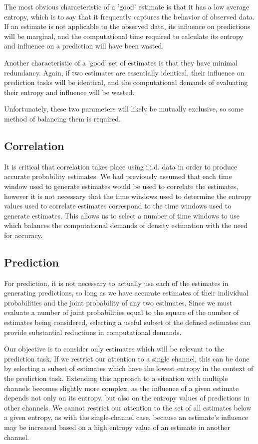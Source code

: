 \documentclass[10pt]{article}
\begin{document}
The most obvious characteristic of a 'good' estimate is that it has a low average entropy, which is to say that it frequently captures the behavior of observed data.  If an estimate is not applicable to the observed data, its influence on predictions will be marginal, and the computational time required to calculate its entropy and influence on a prediction will have been wasted.  

Another characteristic of a 'good' set of estimates is that they have minimal redundancy.  Again, if two estimates are essentially identical, their influence on prediction tasks will be identical, and the computational demands of evaluating their entropy and influence will be wasted. 

Unfortunately, these two parameters will likely be mutually exclusive, so some method of balancing them is required.

\subsection{Correlation}
It is critical that correlation takes place using i.i.d. data in order to produce accurate probability estimates.  We had previously assumed that each time window used to generate estimates would be used to correlate the estimates, however it is not necessary that the time windows used to determine the entropy values used to correlate estimates correspond to the time windows used to generate estimates.  This allows us to select a number of time windows to use which balances the computational demands of density estimation with the need for accuracy.

\subsection{Prediction}
For prediction, it is not necessary to actually use each of the estimates in generating predictions, so long as we have accurate estimates of their individual probabilities and the joint probability of any two estimates.  Since we must evaluate a number of joint probabilities equal to the square of the number of estimates being considered, selecting a useful subset of the defined estimates can provide substantial reductions in computational demands.

Our objective is to consider only estimates which will be relevant to the prediction task.  If we restrict our attention to a single channel, this can be done by selecting a subset of estimates which have the lowest entropy in the context of the prediction task.  Extending this approach to a situation with multiple channels becomes slightly more complex, as the influence of a given estimate depends not only on its entropy, but also on the entropy values of predictions in other channels.  We cannot restrict our attention to the set of all estimates below a given entropy, as with the single-channel case, because an estimate's influence may be increased based on a high entropy value of an estimate in another channel.
\end{document}
